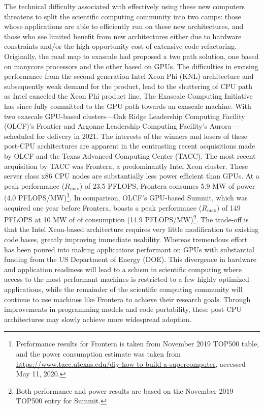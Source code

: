 The technical difficulty associated with effectively using these new computers threatens to split the scientific computing community into two camps: those whose applications are able to efficiently run on these new architectures, and those who see limited benefit from new architectures either due to hardware constraints and/or the high opportunity cost of extensive code refactoring. Originally, the road map to exascale had proposed a two path solution, one based on manycore processors and the other based on GPUs. The difficulties in excising performance from the second generation Intel Xeon Phi (KNL) architecture and subsequently weak demand for the product, lead to the shuttering of CPU path as Intel canceled the Xeon Phi product line. The Exascale Computing Initiative has since fully committed to the GPU path towards an exascale machine. With two exascale GPU-based clusters---Oak Ridge Leadership Computing Facility (OLCF)'s Frontier and Argonne Leadership Computing Facility's Aurora---scheduled for delivery in 2021. The interests of the winners and losers of these post-CPU architectures are apparent in the contrasting recent acquisitions made by OLCF and the Texas Advanced Computing Center (TACC). The most recent acquisition by TACC was Frontera, a predominantly Intel Xeon cluster. These server class x86 CPU nodes are substantially less power efficient than GPUs. At a peak performance ($R_{\max}$) of 23.5 PFLOPS, Frontera consumes 5.9 MW of power (4.0 PFLOPS/MW)\footnote{Performance results for Frontera is taken from November 2019 TOP500 table, and the power consumption estimate was taken from \url{https://www.tacc.utexas.edu/diy-how-to-build-a-supercomputer}, accessed May 11, 2020.}. In comparison, OLCF's GPU-based Summit, which was acquired one year before Frontera, boasts a peak performance ($R_{\max}$) of 149 PFLOPS at 10 MW of of consumption (14.9 PFLOPS/MW)\footnote{Both performance and power results are based on the November 2019 TOP500 entry for Summit.}. The trade-off is that the Intel Xeon-based architecture requires very little modification to existing code bases, greatly improving immediate usability. Whereas tremendous effort has been poured into making applications performant on GPUs with substantial funding from the US Department of Energy (DOE). This divergence in hardware and application readiness will lead to a schism in scientific computing where access to the most performant machines is restricted to a few highly optimized applications, while the remainder of the scientific computing community will continue to use machines like Frontera to achieve their research goals. Through improvements in programming models and code portability, these post-CPU architectures may slowly achieve more widespread adoption.

